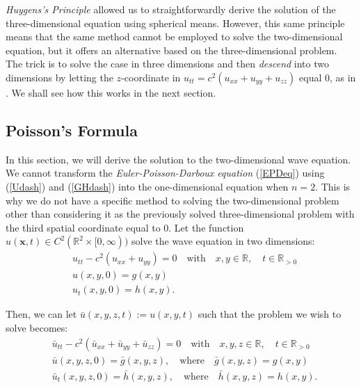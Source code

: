 \documentclass[a4paper, 12pt]{article}
\numberwithin{equation}{section}
\begin{document}
\emph{Huygens's Principle} allowed us to straightforwardly derive the solution
of the three-dimensional equation using spherical means. However, this same
principle means that the same method cannot be employed to solve the
two-dimensional equation, but it offers an alternative based on the
three-dimensional problem. The trick is to solve the case in three dimensions
and then \emph{descend} into two dimensions by letting the $z$-coordinate in
$u_{tt}=c^2(u_{xx}+u_{yy}+u_{zz})$ equal $0$, as in \cite[Ch. 2.4.1.c]{Ev}. We shall see how
this works in the next section. 

\subsection{Poisson's Formula}

In this section, we will derive the solution to the two-dimensional wave
equation. We cannot transform the \emph{Euler-Poisson-Darboux equation}
(\ref{EPDeq}) using (\ref{Udash}) and (\ref{GHdash}) into the one-dimensional
equation when $n=2$. This is why we do not have a specific method to solving the
two-dimensional problem other than considering it as the previously solved
three-dimensional problem with the third spatial coordinate equal to $0$. Let
the function $u(\boldsymbol{x},t) \in C^2(\mathbb{R}^2 \times [0, \infty))$
solve the wave equation in two dimensions:
\begin{equation} \label{2d}
    \begin{aligned}
        &u_{tt}-c^2(u_{xx}+u_{yy})=0 \quad \textrm{with} \quad x,y \in \mathbb{R}, \quad t\in \mathbb{R}_{>0}\\
        &u(x, y, 0)=g(x,y)\\
        &u_t(x,y,0)=h(x,y).
    \end{aligned}
\end{equation}

Then, we can let $\bar{u}(x, y, z, t):=u(x, y, t)$ such that the problem we wish
to solve becomes:
\begin{equation} \label{2das3d}
    \begin{aligned}
        &\bar{u}_{tt}-c^2(\bar{u}_{xx}+\bar{u}_{yy}+\bar{u}_{zz})=0 \quad \textrm{with} \quad x,y,z \in \mathbb{R}, \quad t\in \mathbb{R}_{>0}\\
        &\bar{u}(x, y, z, 0)=\bar{g}(x,y,z), \quad \textrm{where} \quad \bar{g}(x,y,z)=g(x,y)\\
        &\bar{u}_t(x,y,z,0)=\bar{h}(x,y,z), \quad \textrm{where} \quad \bar{h}(x,y,z)=h(x,y).
    \end{aligned}
\end{equation}
\end{document}
